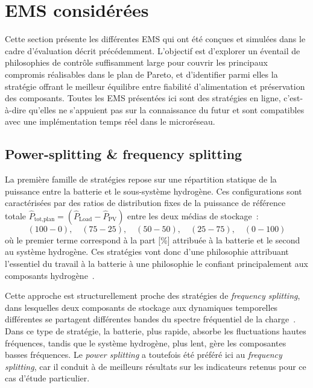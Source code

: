 
\section{EMS considérées}
\label{sec:ems}

Cette section présente les différentes EMS qui ont été conçues et simulées dans le cadre d'évaluation décrit précédemment. L'objectif est d'explorer un éventail de philosophies de contrôle suffisamment large pour couvrir les principaux compromis réalisables dans le plan de Pareto, et d'identifier parmi elles la stratégie offrant le meilleur équilibre entre fiabilité d'alimentation et préservation des composants. Toutes les EMS présentées ici sont des stratégies en ligne, c'est-à-dire qu'elles ne s'appuient pas sur la connaissance du futur et sont compatibles avec une implémentation temps réel dans le microréseau.

\subsection{Power-splitting \& frequency splitting}

La première famille de stratégies repose sur une répartition statique de la puissance entre la batterie et le sous-système hydrogène. Ces configurations sont caractérisées par des ratios de distribution fixes de la puissance de référence totale $\hat{P}_{\text{tot,plan}} = (\hat{P}_{\text{Load}} - \hat{P}_{\text{PV}})$ entre les deux médias de stockage~:
\[
(100-0), \quad (75-25), \quad (50-50), \quad (25-75), \quad (0-100)
\]
où le premier terme correspond à la part [\%] attribuée à la batterie et le second au système hydrogène. Ces stratégies vont donc d'une philosophie attribuant l'essentiel du travail à la batterie à une philosophie le confiant principalement aux composants hydrogène~\cite{eldeeb_hybrid_2019}.

Cette approche est structurellement proche des stratégies de \textit{frequency splitting}, dans lesquelles deux composants de stockage aux dynamiques temporelles différentes se partagent différentes bandes du spectre fréquentiel de la charge~\cite{corapsiz_overview_2023}. Dans ce type de stratégie, la batterie, plus rapide, absorbe les fluctuations hautes fréquences, tandis que le système hydrogène, plus lent, gère les composantes basses fréquences. Le \textit{power splitting} a toutefois été préféré ici au \textit{frequency splitting}, car il conduit à de meilleurs résultats sur les indicateurs retenus pour ce cas d'étude particulier.

